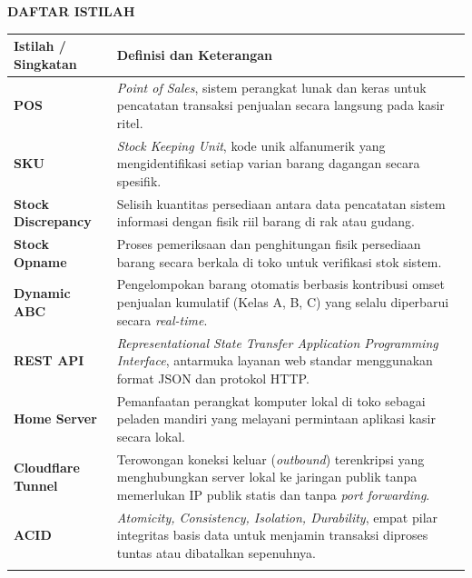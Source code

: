 \documentclass[11pt, a4paper]{article}
\begin{document}
\newpage
{}
\begin{center}
    {\large \textbf{DAFTAR ISTILAH}\par}
\end{center}
\vspace{0.8cm}
\noindent
\begin{tabularx}{\textwidth}{@{}p{3.2cm} X@{}}
\toprule
\textbf{Istilah / Singkatan} & \textbf{Definisi dan Keterangan} \\ \midrule
\textbf{POS} & \textit{Point of Sales}, sistem perangkat lunak dan keras untuk pencatatan transaksi penjualan secara langsung pada kasir ritel. \\ \addlinespace[0.3em]
\textbf{SKU} & \textit{Stock Keeping Unit}, kode unik alfanumerik yang mengidentifikasi setiap varian barang dagangan secara spesifik. \\ \addlinespace[0.3em]
\textbf{Stock Discrepancy} & Selisih kuantitas persediaan antara data pencatatan sistem informasi dengan fisik riil barang di rak atau gudang. \\ \addlinespace[0.3em]
\textbf{Stock Opname} & Proses pemeriksaan dan penghitungan fisik persediaan barang secara berkala di toko untuk verifikasi stok sistem. \\ \addlinespace[0.3em]
\textbf{Dynamic ABC} & Pengelompokan barang otomatis berbasis kontribusi omset penjualan kumulatif (Kelas A, B, C) yang selalu diperbarui secara \textit{real-time}. \\ \addlinespace[0.3em]
\textbf{REST API} & \textit{Representational State Transfer Application Programming Interface}, antarmuka layanan web standar menggunakan format JSON dan protokol HTTP. \\ \addlinespace[0.3em]
\textbf{Home Server} & Pemanfaatan perangkat komputer lokal di toko sebagai peladen mandiri yang melayani permintaan aplikasi kasir secara lokal. \\ \addlinespace[0.3em]
\textbf{Cloudflare Tunnel} & Terowongan koneksi keluar (\textit{outbound}) terenkripsi yang menghubungkan server lokal ke jaringan publik tanpa memerlukan IP publik statis dan tanpa \textit{port forwarding}. \\ \addlinespace[0.3em]
\textbf{ACID} & \textit{Atomicity, Consistency, Isolation, Durability}, empat pilar integritas basis data untuk menjamin transaksi diproses tuntas atau dibatalkan sepenuhnya. \\ \addlinespace[0.3em]

\end{tabularx}
\end{document}
